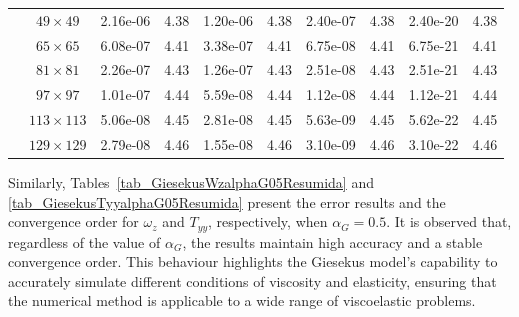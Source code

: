 \documentclass[preprint, 12pt]{elsarticle}
\begin{document}
\begin{center}
\begin{table}[H]
{\begin{tabular*}{\textwidth}{@{\extracolsep\fill}cccccccccc@{}}
    & $49\times 49$ & 2.16e-06 & 4.38 & 1.20e-06 & 4.38 & 2.40e-07 & 4.38 & 2.40e-20 & 4.38 \\
    & $65\times 65$ & 6.08e-07 & 4.41 & 3.38e-07 & 4.41 & 6.75e-08 & 4.41 & 6.75e-21 & 4.41 \\
    & $81\times 81$ & 2.26e-07 & 4.43 & 1.26e-07 & 4.43 & 2.51e-08 & 4.43 & 2.51e-21 & 4.43 \\
    & $97\times 97$ & 1.01e-07 & 4.44 & 5.59e-08 & 4.44 & 1.12e-08 & 4.44 & 1.12e-21 & 4.44 \\
    & $113\times 113$ & 5.06e-08 & 4.45 & 2.81e-08 & 4.45 & 5.63e-09 & 4.45 & 5.62e-22 & 4.45 \\
    & $129\times 129$ & 2.79e-08 & 4.46 & 1.55e-08 & 4.46 & 3.10e-09 & 4.46 & 3.10e-22 & 4.46 \\
    \hline
    \end{tabular*}
}
\end{table}
\end{center}

Similarly, Tables~\ref{tab_GiesekusWzalphaG05Resumida} and \ref{tab_GiesekusTyyalphaG05Resumida} present the error results and the convergence order for $\omega_{z}$ and $T_{yy}$, respectively, when $\alpha_G = 0.5$. It is observed that, regardless of the value of $\alpha_G$, the results maintain high accuracy and a stable convergence order. This behaviour highlights the Giesekus model's capability to accurately simulate different conditions of viscosity and elasticity, ensuring that the numerical method is applicable to a wide range of viscoelastic problems.
\end{document}
